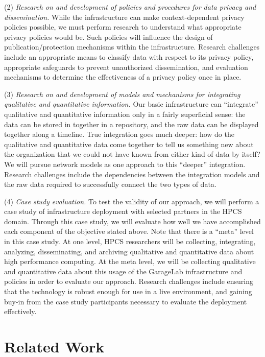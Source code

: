 (2) {\em Research on and development of policies and procedures for data
  privacy and dissemination.} While the infrastructure can make
  context-dependent privacy policies possible, we must perform research to
  understand what appropriate privacy policies would be. Such policies will
  influence the design of publication/protection mechanisms within the
  infrastructure.  Research challenges include an appropriate means to
  classify data with respect to its privacy policy, appropriate safeguards
  to prevent unauthorized dissemination, and evaluation mechanisms to
  determine the effectiveness of a privacy policy once in place. 

(3) {\em Research on and development of models and mechanisms for
  integrating qualitative and quantitative information.}  Our basic
infrastructure can ``integrate'' qualitative and quantitative information
only in a fairly superficial sense: the data can be stored in together in a
repository, and the raw data can be displayed together along a timeline.
True integration goes much deeper: how do the qualitative and quantitative
data come together to tell us something new about the organization that we
could not have known from either kind of data by itself?  We will pursue
network models \cite{Pentland05} as one approach to this ``deeper''
integration.  Research challenges include the dependencies between the
integration models and the raw data required to successfully connect the
two types of data.

(4) {\em Case study evaluation.}  To test the validity of our approach, we
  will perform a case study of infrastructure deployment with selected
  partners in the HPCS domain. Through this case study, we will evaluate
  how well we have accomplished each component of the objective stated
  above. Note that there is a ``meta'' level in this case study. At one
  level, HPCS researchers will be collecting, integrating, analyzing,
  disseminating, and archiving qualitative and quantitative data about high
  performance computing.  At the meta level, we will be collecting
  qualitative and quantitative data about this usage of the GarageLab
  infrastructure and policies in order to evaluate our approach.  Research
  challenges include ensuring that the technology is robust enough for use
  in a live environment, and gaining buy-in from the case study
  participants necessary to evaluate the deployment effectively.


\section{Related Work}

